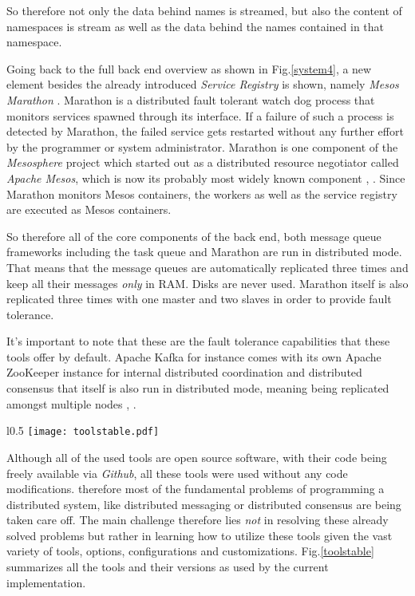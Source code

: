 So therefore not only the data behind names is streamed, but also
the content of namespaces is stream as well as the data behind the
names contained in that namespace.
\newline

Going back to the full back end overview as shown in Fig.\ref{system4},
a new element besides the already introduced \textit{Service Registry}
is shown, namely \textit{Mesos Marathon} \cite{marathon}.
Marathon is a distributed
fault tolerant watch dog process that monitors services spawned
through its interface. If a failure of such a process is detected
by Marathon, the failed service gets restarted without any further
effort by the programmer or system administrator. Marathon is one
component of the \textit{Mesosphere} project which started out
as a distributed resource negotiator called \textit{Apache Mesos},
which is now its probably most widely known component
\cite{mesosphere}, \cite{mesos}. Since Marathon monitors
Mesos containers, the workers as well as the service registry are
executed as Mesos containers.
\newline

So therefore all of the core components of the back end, both message
queue frameworks including the task queue and Marathon are run in
distributed mode. That means that the message queues are automatically
replicated three times and keep all their messages \textit{only} in RAM.
Disks are never used. Marathon itself is also replicated three times
with one master and two slaves in order to provide fault tolerance.

It's important to note that these are the fault tolerance capabilities
that these tools offer by default. Apache Kafka for instance comes
with its own Apache ZooKeeper instance for internal distributed
coordination and distributed consensus that itself is also run in
distributed mode, meaning being replicated amongst multiple nodes
\cite{zk}, \cite{zkpaper}.

\begin{wrapfigure}{l}{0.5\textwidth}
  \texttt{[image: toolstable.pdf]}
  \caption{Overview over the tools and their versions as used
           in the current implementation.}
  \label{toolstable}
  \vspace{-10pt}
\end{wrapfigure}

Although all of the used tools are open source software, with their
code being freely available via \textit{Github}, all these tools were
used without any code modifications. therefore most of the fundamental
problems of programming a distributed system, like distributed
messaging or distributed consensus are being taken care off.
The main challenge therefore lies \textit{not} in resolving these
already solved problems but rather in learning how to utilize
these tools given the vast variety of tools, options, configurations
and customizations.
Fig.\ref{toolstable} summarizes all the tools and their versions
as used by the current implementation.

